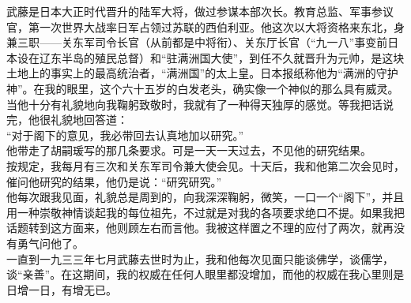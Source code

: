 武藤是日本大正时代晋升的陆军大将，做过参谋本部次长。教育总监、军事参议官，第一次世界大战率日军占领过苏联的西伯利亚。他这次以大将资格来东北，身兼三职——关东军司令长官（从前都是中将衔）、关东厅长官（“九一八”事变前日本设在辽东半岛的殖民总督）和“驻满洲国大使”，到任不久就晋升为元帅，是这块土地上的事实上的最高统治者，“满洲国”的太上皇。日本报纸称他为“满洲的守护神”。在我的眼里，这个六十五岁的白发老头，确实像一个神似的那么具有威灵。当他十分有礼貌地向我鞠躬致敬时，我就有了一种得天独厚的感觉。等我把话说完，他很礼貌地回答道：\\

“对于阁下的意见，我必带回去认真地加以研究。”\\

他带走了胡嗣瑗写的那几条要求。可是一天一天过去，不见他的研究结果。\\

按规定，我每月有三次和关东军司令兼大使会见。十天后，我和他第二次会见时，催问他研究的结果，他仍是说：“研究研究。”\\

他每次跟我见面，礼貌总是周到的，向我深深鞠躬，微笑，一口一个“阁下”，并且用一种崇敬神情谈起我的每位祖先，不过就是对我的各项要求绝口不提。如果我把话题转到这方面来，他则顾左右而言他。我被这样置之不理的应付了两次，就再没有勇气问他了。\\

一直到一九三三年七月武藤去世时为止，我和他每次见面只能谈佛学，谈儒学，谈“亲善”。在这期间，我的权威在任何人眼里都没增加，而他的权威在我心里则是日增一日，有增无已。\\